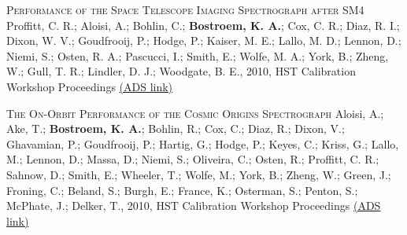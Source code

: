 \begin{revnumerate}[24]
\item{\textsc{Performance of the Space Telescope Imaging Spectrograph after SM4}
Proffitt, C. R.; Aloisi, A.; Bohlin, C.; \textbf{Bostroem, K. A.}; Cox, C. R.; Diaz, R. I.; Dixon, W. V.; Goudfrooij, P.; Hodge, P.; Kaiser, M. E.; Lallo, M. D.; Lennon, D.; Niemi, S.; Osten, R. A.; Pascucci, I.; Smith, E.; Wolfe, M. A.; York, B.; Zheng, W.; Gull, T. R.; Lindler, D. J.; Woodgate, B. E., 2010, HST Calibration Workshop Proceedings
\color{blue}\href{https://ui.adsabs.harvard.edu/#abs/2010hstc.workE...6P/abstract}{(ADS link)}\color{black}}\\
\item{\textsc{The On-Orbit Performance of the Cosmic Origins Spectrograph}
Aloisi, A.; Ake, T.; \textbf{Bostroem, K. A.}; Bohlin, R.; Cox, C.; Diaz, R.; Dixon, V.; Ghavamian, P.; Goudfrooij, P.; Hartig, G.; Hodge, P.; Keyes, C.; Kriss, G.; Lallo, M.; Lennon, D.; Massa, D.; Niemi, S.; Oliveira, C.; Osten, R.; Proffitt, C. R.; Sahnow, D.; Smith, E.; Wheeler, T.; Wolfe, M.; York, B.; Zheng, W.; Green, J.; Froning, C.; Beland, S.; Burgh, E.; France, K.; Osterman, S.; Penton, S.; McPhate, J.; Delker, T., 2010, HST Calibration Workshop Proceedings 
\color{blue}\href{https://ui.adsabs.harvard.edu/#abs/2010hstc.workE...3A/abstract}{(ADS link)}\color{black}}\\
\end{revnumerate}
